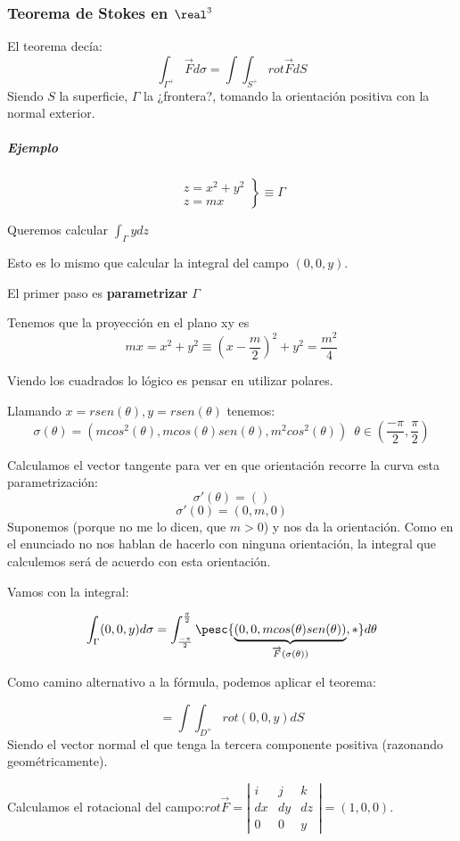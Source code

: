 \subsubsection{Teorema de Stokes en $\real^3$}

El teorema decía: \[
\int_{\Gamma^+}\overrightarrow{F}d\sigma = \int \int_{S^+} rot\overrightarrow{F} dS
\]
Siendo $S$ la superficie, $\Gamma$ la ¿frontera?, tomando la orientación positiva con la normal exterior.

\subparagraph{Ejemplo}
\[
\left.\begin{array}{cc}
z=x^2+y^2\\
z=mx \end{array} \right\} \equiv \Gamma
\]

Queremos calcular $\displaystyle \int_{\Gamma}y dz$

Esto es lo mismo que calcular la integral del campo $(0,0,y)$.

El primer paso es \textbf{parametrizar} $\Gamma$

Tenemos que la proyección en el plano xy es \[mx=x^2+y^2 \equiv \left(x-\frac{m}{2}\right)^2 + y^2 = \frac{m^2}{4}\]

Viendo los cuadrados lo lógico es pensar en utilizar polares.

Llamando $x=rsen(\theta),y=rsen(\theta)$ tenemos:
\[\sigma(\theta) = \left(mcos^2(\theta),mcos(\theta)sen(\theta),m^2cos^2(\theta)\right)\,\,\,\theta\in\left(\frac{-\pi}{2},\frac{\pi}{2}\right)\]

Calculamos el vector tangente para ver en que orientación recorre la curva esta parametrización:
\[\sigma'(\theta) = ()\]
\[\sigma'(0) = (0,m,0)\]
Suponemos (porque no me lo dicen, que $m>0$) y nos da la orientación. Como en el enunciado no nos hablan de hacerlo con ninguna orientación, la integral que calculemos será de acuerdo con esta orientación.

Vamos con la integral:

\[\int_{\Gamma}(0,0,y) d\sigma =\int_{\frac{-\pi}{2}}^{\frac{\pi}{2}}\pesc{\underbrace{\left(0,0,mcos(\theta)sen(\theta)\right)}_{\overrightarrow{F}(\sigma(\theta))},\ast} d\theta\]

Como camino alternativo a la fórmula, podemos aplicar el teorema:

\[ = \int\int_{D^+}  rot(0,0,y)dS\] Siendo el vector normal el que tenga la tercera componente positiva (razonando geométricamente).

Calculamos el rotacional del campo:$rot\overrightarrow{F} =\left|\begin{matrix}
i&j&k\\dx&dy&dz\\0&0&y
\end{matrix}\right| = (1,0,0)$.

